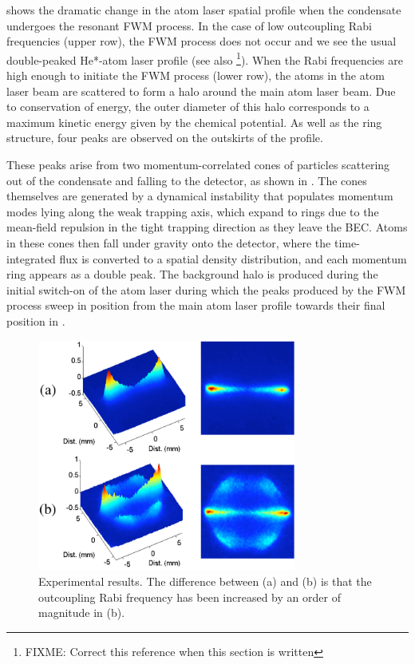  shows the dramatic change in the atom laser spatial profile when the condensate undergoes the resonant FWM process. In the case of low outcoupling Rabi frequencies (upper row), the FWM process does not occur and we see the usual double-peaked He*-atom laser profile \citep{Dall:2007} (see also \footnote{FIXME: Correct this reference when this section is written}). When the Rabi frequencies are high enough to initiate the FWM process (lower row), the atoms in the atom laser beam are scattered to form a halo around the main atom laser beam. Due to conservation of energy, the outer diameter of this halo corresponds to a maximum kinetic energy given by the chemical potential. As well as the ring structure, four peaks are observed on the outskirts of the profile.

These peaks arise from two momentum-correlated cones of particles scattering out of the condensate and falling to the detector, as shown in . The cones themselves are generated by a dynamical instability that populates momentum modes lying along the weak trapping axis, which expand to rings due to the mean-field repulsion in the tight trapping direction as they leave the BEC. Atoms in these cones then fall under gravity onto the detector, where the time-integrated flux is converted to a spatial density distribution, and each momentum ring appears as a double peak. The background halo is produced during the initial switch-on of the atom laser during which the peaks produced by the FWM process sweep in position from the main atom laser profile towards their final position in .

\begin{figure}
    \centering
        \includegraphics[height=3in]{ExperimentalResults}
    \caption{Experimental results. The difference between (a) and (b) is that the outcoupling Rabi frequency has been increased by an order of magnitude in (b).}
    \label{Peaks:ExperimentalResults}
\end{figure}

